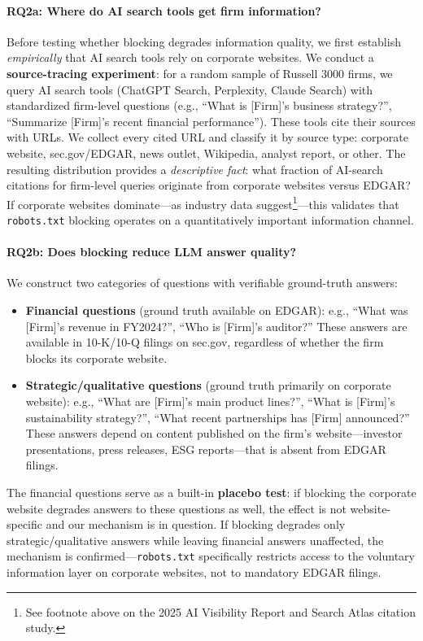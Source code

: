 \documentclass[12pt,a4paper]{article}
\begin{document}
\paragraph{RQ2a: Where do AI search tools get firm information?} Before testing whether blocking degrades information quality, we first establish \emph{empirically} that AI search tools rely on corporate websites. We conduct a \textbf{source-tracing experiment}: for a random sample of Russell 3000 firms, we query AI search tools (ChatGPT Search, Perplexity, Claude Search) with standardized firm-level questions (e.g., ``What is [Firm]'s business strategy?'', ``Summarize [Firm]'s recent financial performance''). These tools cite their sources with URLs. We collect every cited URL and classify it by source type: corporate website, sec.gov/EDGAR, news outlet, Wikipedia, analyst report, or other. The resulting distribution provides a \emph{descriptive fact}: what fraction of AI-search citations for firm-level queries originate from corporate websites versus EDGAR? If corporate websites dominate---as industry data suggest\footnote{See footnote above on the 2025 AI Visibility Report and Search Atlas citation study.}---this validates that \texttt{robots.txt} blocking operates on a quantitatively important information channel.

\paragraph{RQ2b: Does blocking reduce LLM answer quality?} We construct two categories of questions with verifiable ground-truth answers:

\begin{itemize}
    \item \textbf{Financial questions} (ground truth available on EDGAR): e.g., ``What was [Firm]'s revenue in FY2024?'', ``Who is [Firm]'s auditor?'' These answers are available in 10-K/10-Q filings on sec.gov, regardless of whether the firm blocks its corporate website.
    \item \textbf{Strategic/qualitative questions} (ground truth primarily on corporate website): e.g., ``What are [Firm]'s main product lines?'', ``What is [Firm]'s sustainability strategy?'', ``What recent partnerships has [Firm] announced?'' These answers depend on content published on the firm's website---investor presentations, press releases, ESG reports---that is absent from EDGAR filings.
\end{itemize}

The financial questions serve as a built-in \textbf{placebo test}: if blocking the corporate website degrades answers to these questions as well, the effect is not website-specific and our mechanism is in question. If blocking degrades only strategic/qualitative answers while leaving financial answers unaffected, the mechanism is confirmed---\texttt{robots.txt} specifically restricts access to the voluntary information layer on corporate websites, not to mandatory EDGAR filings.
\end{document}

